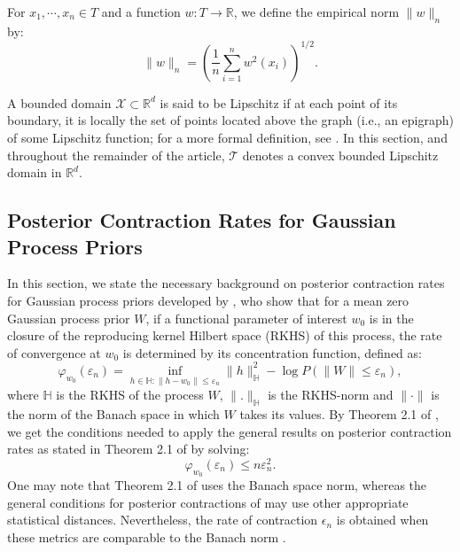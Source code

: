 \documentclass[ejs,noshowframe]{imsart}
\theoremstyle{plain}
\theoremstyle{definition}
\theoremstyle{remark}
\begin{document}
For $x_1, \cdots, x_n\in T$ and a function $w:T \to \mathbb{R}$, we define the empirical norm   $\|w\|_n$ by: 
$$
\|w\|_n=\left( \frac{1}{n} \sum_{i=1}^n w^2(x_i)\right)^{1/2}.
$$

A bounded domain $\mathcal{X} \subset \mathbb{R}^d$ is said to be Lipschitz if at each point of its boundary, it is locally the set of points located above the graph (i.e., an epigraph) of some Lipschitz function; for a more formal definition, see \citet[][p.~227]{wellner2013weak}.  In this section, and throughout the remainder of the article, $\mathcal{T}$ denotes a convex bounded Lipschitz domain in $\mathbb{R}^d$.

\subsection{Posterior Contraction Rates for Gaussian Process Priors} \label{section2.3}
In this section, we state the necessary background on posterior contraction rates for Gaussian process priors developed by \cite{van2008rates}, who show that  for a mean zero Gaussian process prior $W$, if a functional parameter of interest $w_0$ is in the closure of the reproducing kernel Hilbert space (RKHS) of
this process,  the rate of convergence  at $w_0$ is determined by  its concentration function, defined as:
\begin{equation}
\varphi_{w_0}(\varepsilon_n)= \inf_{h \in {\mathbb{H}}:\|h-w_0\|\le\varepsilon_n}\|h\|_{\mathbb{H}}^2 -\log P(\| W\| \le \varepsilon_n), 
\end{equation}
where ${\mathbb{H}}$ is the RKHS of the process $W$, $\|.\|_{\mathbb{H}}$ is the RKHS-norm  and $\|\cdot\|$ is the norm of the Banach space in which
 $W$ takes its values. By Theorem 2.1 of \cite{van2008rates}, we get the conditions needed to apply the general results on  posterior contraction rates  as stated in Theorem 2.1 of \cite{ghosal2000convergence} by solving:
\begin{equation}
    \varphi_{w_0}(\varepsilon_n) \le n \varepsilon_n^2.\label{concentration function}
\end{equation}
 One may note that Theorem 2.1 of  \cite{van2008rates} uses the Banach space norm, whereas the general conditions for posterior contractions of \citet{ghosal2000convergence} may use other appropriate statistical distances. Nevertheless, the rate of contraction $\epsilon_n$
is obtained when these metrics  are comparable to the  Banach norm \citep[p.~1439,][]{van2008rates}.
\end{document}
